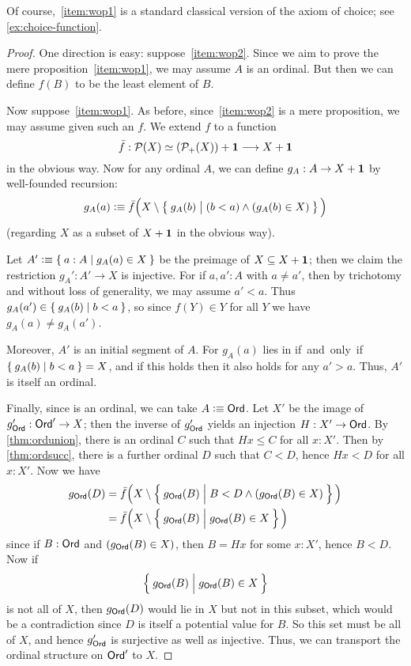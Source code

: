 \noindent
Of course,~\ref{item:wop1} is a standard classical version of the axiom of choice; see \autoref{ex:choice-function}.

\begin{proof}
  One direction is easy: suppose~\ref{item:wop2}.
  Since we aim to prove the mere proposition~\ref{item:wop1}, we may assume $A$ is an ordinal.
  But then we can define $f(B)$ to be the least element of $B$.

  Now suppose~\ref{item:wop1}.
  As before, since~\ref{item:wop2} is a mere proposition, we may assume given such an $f$.
  We extend $f$ to a function
  \[ \bar f:\mathcal{P}(X) \simeq (\mathcal{P}_+(X)) + \mathbf{1} \longrightarrow X+\mathbf{1}
  \]
  in the obvious way.
  Now for any ordinal $A$, we can define $g_A:A\to X+\mathbf{1}$ by well-founded recursion:
  \[ g_A(a) \vcentcolon\equiv 
    \bar f\Big(X \setminus \Set{ g_A(b) | \strut (b<a) \wedge (g_A(b) \in X) }\Big)
  \]
  (regarding $X$ as a subset of $X+\mathbf{1}$ in the obvious way).

  Let $A'\vcentcolon\equiv \Set{a:A | g_A(a) \in X}$ be the preimage of $X\subseteq X+\mathbf{1}$; then we claim the restriction $g_A':A' \to X$ is injective.
  For if $a,a':A$ with $a\neq a'$, then by trichotomy and without loss of generality, we may assume $a'<a$.
  Thus $g_A(a') \in \Set{ g_A(b) | b<a }$, so since $f(Y)\in Y$ for all $Y$ we have $g_A(a) \neq g_A(a')$.

  Moreover, $A'$ is an initial segment of $A$.
  For $g_A(a)$ lies in \unit if and only if $\Set{g_A(b)|b<a} = X$, and if this holds then it also holds for any $a'>a$.
  Thus, $A'$ is itself an ordinal.

  Finally, since \ord is an ordinal, we can take $A\vcentcolon\equiv\mathsf{Ord}$.
  Let $X'$ be the image of $g_\mathsf{Ord}':\mathsf{Ord}' \to X$; then the inverse of $g_\mathsf{Ord}'$ yields an injection $H:X'\to \mathsf{Ord}$.
  By \autoref{thm:ordunion}, there is an ordinal $C$ such that $Hx\le C$ for all $x:X'$.
  Then by \autoref{thm:ordsucc}, there is a further ordinal $D$ such that $C<D$, hence $Hx<D$ for all $x:X'$.
  Now we have
  \begin{align*}
    g_{\ord}(D) &= \bar f\Big( X \setminus \setof{ g_\ord(B) | \rule{0pt}{1em} B<D \wedge (g_\ord(B) \in X)} \Big)\\
    &=\bar f\Big( X \setminus \setof{ g_\ord(B) | \rule{0pt}{1em} g_\ord(B) \in X} \Big)
  \end{align*}
  since if $B:\mathsf{Ord}$ and $(g_\mathsf{Ord}(B) \in X)$, then $B = Hx$ for some $x:X'$, hence $B<D$.
  Now if
  \[\setof{ g_\ord(B) | \rule{0pt}{1em} g_\ord(B) \in X}\]
  is not all of $X$, then $g_\mathsf{Ord}(D)$ would lie in $X$ but not in this subset, which would be a contradiction since $D$ is itself a potential value for $B$.
  So this set must be all of $X$, and hence $g_\mathsf{Ord}'$ is surjective as well as injective.
  Thus, we can transport the ordinal structure on $\mathsf{Ord}'$ to $X$.
\end{proof}

